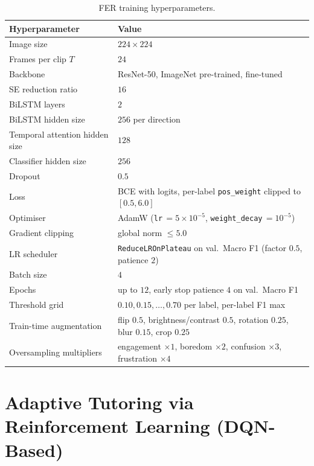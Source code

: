 \begin{table}[H]
\centering
\caption{\ac{FER} training hyperparameters.}
\label{tab:fer_hparams}
\begin{tabular}{ll}
\toprule
\textbf{Hyperparameter} & \textbf{Value} \\
\midrule
Image size                      & $224 \times 224$ \\
Frames per clip $T$             & $24$ \\
Backbone                        & ResNet-50, ImageNet pre-trained, fine-tuned \\
\ac{SE} reduction ratio              & $16$ \\
\ac{BiLSTM} layers                   & $2$ \\
\ac{BiLSTM} hidden size              & $256$ per direction \\
Temporal attention hidden size  & $128$ \\
Classifier hidden size          & $256$ \\
Dropout                         & $0.5$ \\
Loss                            & \ac{BCE} with logits, per-label \texttt{pos\_weight} clipped to $[0.5, 6.0]$ \\
Optimiser                       & AdamW (\texttt{lr}\,$=5\!\times\!10^{-5}$, \texttt{weight\_decay}\,$=10^{-5}$) \\
Gradient clipping               & global norm $\leq 5.0$ \\
LR scheduler                    & \texttt{ReduceLROnPlateau} on val.\ Macro F1 (factor $0.5$, patience $2$) \\
Batch size                      & $4$ \\
Epochs                          & up to $12$, early stop patience $4$ on val.\ Macro F1 \\
Threshold grid                  & $0.10, 0.15, \dots, 0.70$ per label, per-label F1 max \\
Train-time augmentation         & flip $0.5$, brightness/contrast $0.5$, rotation $0.25$, blur $0.15$, crop $0.25$ \\
Oversampling multipliers        & engagement $\times 1$, boredom $\times 2$, confusion $\times 3$, frustration $\times 4$ \\
\bottomrule
\end{tabular}
\end{table}
\section{Adaptive Tutoring via Reinforcement Learning (\ac{DQN}-Based)}\label{sec:method_rl_chapter}

